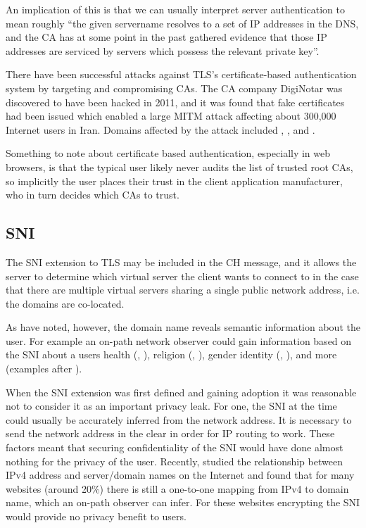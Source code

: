 An implication of this is that we can usually interpret
server authentication to mean roughly
``the given servername resolves to a set of \ac{IP} addresses in the \ac{DNS},
and the \ac{CA} has at some point in the past gathered
evidence that those \ac{IP} addresses are serviced by
servers which possess the relevant private key''.

There have been successful attacks against \ac{TLS}'s certificate-based
authentication system by targeting and compromising \ac{CA}s.
The \ac{CA} company DigiNotar was discovered to have been hacked in 2011, and it was found
that fake certificates had been issued which enabled a large \ac{MITM} attack affecting about 300,000 Internet users in Iran.
Domains affected by the attack included , , and  \citep{van2013diginotar}.

Something to note about certificate based authentication, especially
in web browsers, is that the typical user likely never audits the list of
trusted root \ac{CA}s,
so implicitly the user places their trust in the
client application manufacturer,
who in turn decides which \ac{CA}s to trust.


\subsection{SNI}
The \ac{SNI} extension to \ac{TLS} may be included in the \ac{CH} message, and it allows the server to determine which virtual server the client wants to connect to in the case that there are multiple virtual servers sharing a single public network address, i.e. the domains are co-located.


As \cite{hoang-2020-assessing-privacy-benefits-sni-encryption} have noted, however, the domain name reveals semantic information about the user.
For example an on-path network observer could gain information
based on the \ac{SNI}
about a users health (, ), religion (, ), gender identity (, ), and more (examples after \cite{hoang-2020-assessing-privacy-benefits-sni-encryption}).

When the \ac{SNI} extension was first defined and gaining adoption it was reasonable not to consider it as an important privacy leak.
For one, the \ac{SNI} at the time could usually be accurately inferred from the network address.
It is necessary to send the network address in the clear in order for \ac{IP} routing to work.
These factors meant that securing confidentiality of the \ac{SNI} would have done almost nothing for the privacy of the user.
Recently, \cite{hoang-2020-assessing-privacy-benefits-sni-encryption} studied the relationship between IPv4 address
and server/domain names on the Internet and found that for many websites
(around 20\%) there is still a one-to-one mapping from IPv4 to domain name,
which an on-path observer can infer.
For these websites encrypting the \ac{SNI} would provide no privacy benefit to users.

